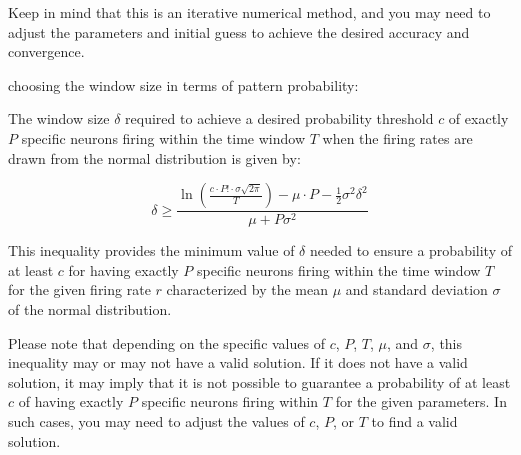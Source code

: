 Keep in mind that this is an iterative numerical method, and you may need to adjust the parameters and initial guess to achieve the desired accuracy and convergence.


choosing the window size in terms of pattern probability:

The window size \(\delta\) required to achieve a desired probability threshold \(c\) of exactly \(P\) specific neurons firing within the time window \(T\) when the firing rates are drawn from the normal distribution is given by:

\begin{equation}
\delta \geq \frac{{\ln\left(\frac{{c \cdot P! \cdot \sigma \sqrt{2\pi}}}{{T}}\right) - \mu \cdot P - \frac{1}{2}\sigma^2 \delta^2}}{{\mu + P\sigma^2}}
\end{equation}

This inequality provides the minimum value of \(\delta\) needed to ensure a probability of at least \(c\) for having exactly \(P\) specific neurons firing within the time window \(T\) for the given firing rate \(r\) characterized by the mean \(\mu\) and standard deviation \(\sigma\) of the normal distribution.

Please note that depending on the specific values of \(c\), \(P\), \(T\), \(\mu\), and \(\sigma\), this inequality may or may not have a valid solution. If it does not have a valid solution, it may imply that it is not possible to guarantee a probability of at least \(c\) of having exactly \(P\) specific neurons firing within \(T\) for the given parameters. In such cases, you may need to adjust the values of \(c\), \(P\), or \(T\) to find a valid solution.

